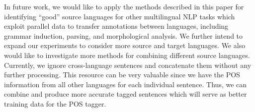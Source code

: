 In future work, we would like to apply the methods described in this
paper for identifying ``good'' source languages for other multilingual
NLP tasks which exploit parallel data to transfer annotations between
languages, including grammar induction, parsing, and morphological
analysis. We further intend to expand our experiments to consider more
source and target languages. We also would like to investigate more methods for combining different source languages. Currently, we ignore cross-language sentences and concatenate them without any further processing. This resource can be very valuable since we have the POS information from all other languages for each individual sentence. Thus, we can combine and produce more accurate tagged sentences which will serve as better training data for the POS tagger. 
